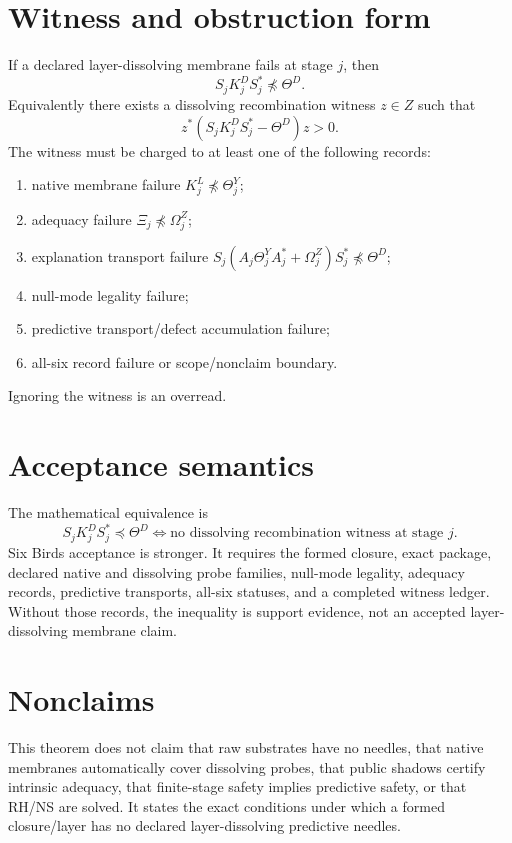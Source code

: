 \documentclass[11pt]{article}
\begin{document}
\section{Witness and obstruction form}
If a declared layer-dissolving membrane fails at stage $j$, then
\[
 S_jK^D_jS_j^*\npreceq\Theta^D.
\]
Equivalently there exists a dissolving recombination witness $z\in Z$ such that
\[
 z^*(S_jK^D_jS_j^*-\Theta^D)z>0.
\]
The witness must be charged to at least one of the following records:
\begin{enumerate}[label=(\roman*)]
\item native membrane failure $K^L_j\npreceq\Theta^Y_j$;
\item adequacy failure $\Xi_j\npreceq\Omega^Z_j$;
\item explanation transport failure $S_j(A_j\Theta^Y_jA_j^*+\Omega^Z_j)S_j^*\npreceq\Theta^D$;
\item null-mode legality failure;
\item predictive transport/defect accumulation failure;
\item all-six record failure or scope/nonclaim boundary.
\end{enumerate}
Ignoring the witness is an overread.

\section{Acceptance semantics}
The mathematical equivalence is
\[
 S_jK^D_jS_j^*\preceq\Theta^D
\iff
\text{no dissolving recombination witness at stage }j.
\]
Six Birds acceptance is stronger.  It requires the formed closure, exact package, declared native and dissolving probe families, null-mode legality, adequacy records, predictive transports, all-six statuses, and a completed witness ledger.  Without those records, the inequality is support evidence, not an accepted layer-dissolving membrane claim.

\section{Nonclaims}
This theorem does not claim that raw substrates have no needles, that native membranes automatically cover dissolving probes, that public shadows certify intrinsic adequacy, that finite-stage safety implies predictive safety, or that RH/NS are solved.  It states the exact conditions under which a formed closure/layer has no declared layer-dissolving predictive needles.
\end{document}
